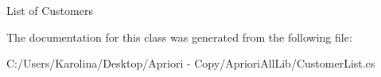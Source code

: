 List of Customers 



The documentation for this class was generated from the following file\-:\begin{DoxyCompactItemize}
\item 
C\-:/\-Users/\-Karolina/\-Desktop/\-Apriori -\/ Copy/\-Apriori\-All\-Lib/Customer\-List.\-cs\end{DoxyCompactItemize}
